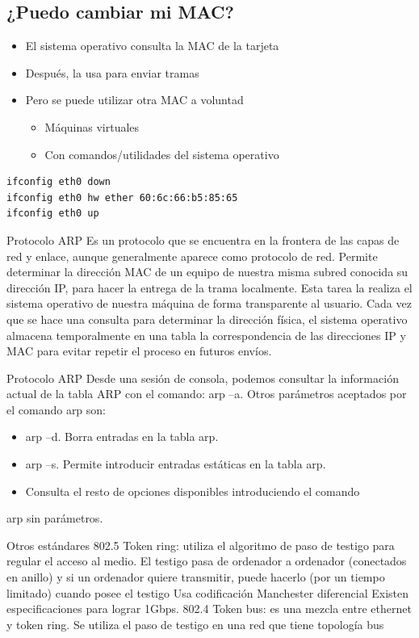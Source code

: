\documentclass{article}
\begin{document}
\subsection{¿Puedo cambiar mi MAC?}
\label{sec:orgf7d3a9b}
\begin{itemize}
\item El sistema operativo consulta la MAC de la tarjeta
\item Después, la usa para enviar tramas
\item Pero se puede utilizar otra MAC a voluntad
\begin{itemize}
\item Máquinas virtuales
\item Con comandos/utilidades del sistema operativo
\end{itemize}
\end{itemize}

\lstset{language=shell,label= ,caption= ,captionpos=b,numbers=none}
\begin{lstlisting}
ifconfig eth0 down
ifconfig eth0 hw ether 60:6c:66:b5:85:65
ifconfig eth0 up
\end{lstlisting}



Protocolo ARP Es un protocolo que se encuentra en la frontera de las capas de red y enlace, aunque generalmente aparece como protocolo de red.  Permite determinar la dirección MAC de un equipo de nuestra misma subred conocida su dirección IP, para hacer la entrega de la trama localmente. Esta tarea la realiza el sistema operativo de nuestra máquina de forma transparente al usuario.  Cada vez que se hace una consulta para determinar la dirección física, el sistema operativo almacena temporalmente en una tabla la correspondencia de las direcciones IP y MAC para evitar repetir el proceso en futuros envíos.


Protocolo ARP Desde una sesión de consola, podemos consultar la información actual de la tabla ARP con el comando: arp –a.  Otros parámetros aceptados por el comando arp son:
\begin{itemize}
\item arp –d. Borra entradas en la tabla arp.
\item arp –s. Permite introducir entradas estáticas en la tabla arp.
\item Consulta el resto de opciones disponibles introduciendo el comando
\end{itemize}
arp sin parámetros.


Otros estándares 802.5 Token ring: utiliza el algoritmo de paso de testigo para regular el acceso al medio.  El testigo pasa de ordenador a ordenador (conectados en anillo) y si un ordenador quiere transmitir, puede hacerlo (por un tiempo limitado) cuando posee el testigo Usa codificación Manchester diferencial Existen especificaciones para lograr 1Gbps.  802.4 Token bus: es una mezcla entre ethernet y token ring. Se utiliza el paso de testigo en una red que tiene topología bus
\end{document}

